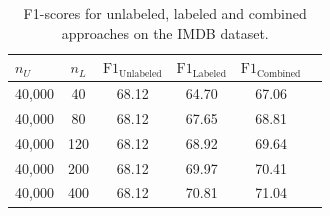 \begin{table}[t]
\caption{F1-scores for unlabeled, labeled and combined approaches on the IMDB dataset. }
\label{tab:real_combo}
\vskip 0.15in
\renewcommand{\arraystretch}{1.25} %
\begin{center}
\begin{small}
\begin{tabular}{lccccr}
\hline
$n_U$ & $n_L$ & $\text{F1}_\text{Unlabeled}$ & $\text{F1}_\text{Labeled}$ &  $\text{F1}_\text{Combined}$ \\
\hline
40,000 & 40 & 68.12 & 64.70 & 67.06 \\
40,000 & 80 & 68.12 & 67.65 & 68.81 \\
40,000 & 120 & 68.12 & 68.92 & 69.64 \\
40,000 & 200 & 68.12 & 69.97 & 70.41 \\
40,000 & 400 & 68.12 & 70.81 & 71.04 \\
\hline
\end{tabular}
\end{small}
\end{center}
\vskip -0.1in
\end{table}



